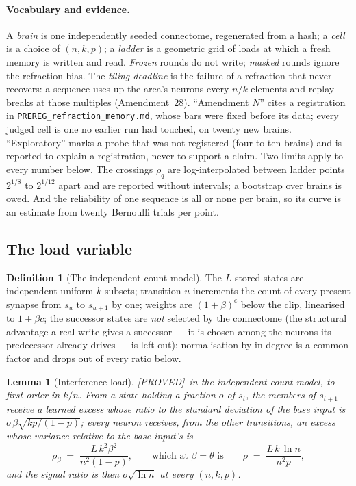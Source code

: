 \documentclass[11pt]{article}
\theoremstyle{definition}
\newtheorem{definition}{Definition}
\theoremstyle{plain}
\newtheorem{lemma}{Lemma}
\newcommand{\PROVED}{\textnormal{\footnotesize\textsf{[PROVED]}}}
\begin{document}
\paragraph{Vocabulary and evidence.} A \emph{brain} is one independently seeded
connectome, regenerated from a hash; a \emph{cell} is a choice of $(n,k,p)$;
a \emph{ladder} is a geometric grid of loads at which a fresh memory is written
and read. \emph{Frozen} rounds do not write; \emph{masked} rounds ignore the
refraction bias. The \emph{tiling deadline} is the failure of a refraction that
never recovers: a sequence uses up the area's neurons every $n/k$ elements and
replay breaks at those multiples (Amendment~28). ``Amendment $N$'' cites a
registration in \texttt{PREREG\_refraction\_memory.md}, whose bars were fixed
before its data; every judged cell is one no earlier run had touched, on twenty
new brains. ``Exploratory'' marks a probe that was not registered (four to ten
brains) and is reported to explain a registration, never to support a claim.
Two limits apply to every number below. The crossings $\rho_q$ are
log-interpolated between ladder points $2^{1/8}$ to $2^{1/12}$ apart and are
reported without intervals; a bootstrap over brains is owed. And the reliability
of one sequence is all or none per brain, so its curve is an estimate from
twenty Bernoulli trials per point.

\subsection{The load variable}

\begin{definition}[The independent-count model]\label{def:icm}
The $L$ stored states are independent uniform $k$-subsets; transition $u$
increments the count of every present synapse from $s_u$ to $s_{u+1}$ by one;
weights are $(1+\beta)^c$ below the clip, linearised to $1 + \beta c$; the
successor states are \emph{not} selected by the connectome (the structural
advantage a real write gives a successor --- it is chosen among the neurons
its predecessor already drives --- is left out); normalisation by in-degree is
a common factor and drops out of every ratio below.
\end{definition}

\begin{lemma}[Interference load]\label{lem:load}
\PROVED\ in the independent-count model, to first order in $k/n$.
From a state holding a fraction $o$ of $s_t$, the members of $s_{t+1}$
receive a learned excess whose ratio to the standard deviation of the base
input is $o\,\beta\sqrt{kp/(1-p)}$; every neuron receives, from the other
transitions, an excess whose variance relative to the base input's is
\[
  \rho_\beta \;=\; \frac{L\,k^2\beta^2}{n^2(1-p)},
  \qquad\text{which at } \beta = \theta \text{ is}\qquad
  \rho \;=\; \frac{L\,k\,\ln n}{n^2 p},
\]
and the signal ratio is then $o\sqrt{\ln n}$ at every $(n,k,p)$.
\end{lemma}
\end{document}
